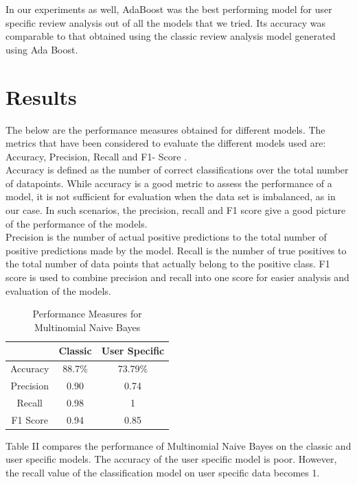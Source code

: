 \documentclass[letterpaper, 10 pt, conference]{ieeeconf}  %
\begin{document}
In our experiments as well, AdaBoost was the best performing model for user specific review analysis out of all the models that we tried. Its accuracy was comparable to that obtained using the classic review analysis model generated using Ada Boost.
\vspace{-2mm}
\section{Results}
The below are the performance measures obtained for different models. The metrics that have been considered to evaluate the different models used are: Accuracy, Precision, Recall and F1- Score \cite{c14}.\\

Accuracy is defined as the number of correct classifications over the total number of datapoints. While accuracy is a good metric to assess the performance of a model, it is not sufficient for evaluation when the data set is imbalanced, as in our case. In such scenarios, the precision, recall and F1 score give a good picture of the performance of the models. \\

Precision is the number of actual positive predictions to the total number of positive predictions made by the model. Recall is the number of true positives to the total number of data points that actually belong to the positive class. F1 score is used to combine precision and recall into one score for easier analysis and evaluation of the models. 

\begin{table}[H]
\begin{center}
 \caption{Performance Measures for Multinomial Naive Bayes}
  \begin{tabular}{ |c|c|c| }
    \hline
    \textbf{}&{\textbf{Classic}} & \textbf{User Specific}\\ \hline
    Accuracy & 88.7\% & 73.79\%\\ \hline
    Precision & 0.90 & 0.74\\ \hline 
    Recall & 0.98 & 1\\ \hline 
    F1 Score & 0.94 & 0.85\\ \hline 
    \hline
  \end{tabular}
\end{center}
\end{table}

Table II compares the performance of Multinomial Naive Bayes on the classic and user specific models. The accuracy of the user specific model is poor. However, the recall value of the classification model on user specific data becomes 1.
\end{document}
